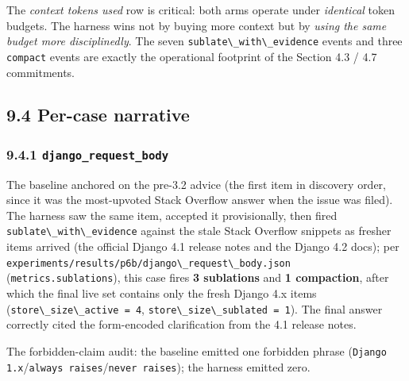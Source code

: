 \begin{table}[!tbp]
\centering
\caption{\textbf{T3 --- P6-B per-case detail.} Sublations fired, compactions, forbidden-claim audit, and final-answer correctness for each of the three Python issues. Source: \texttt{experiments/results/p6b/\_summary.json}.}
\label{tab:t3_p6b}
{\scriptsize\setlength{\tabcolsep}{3pt}%
}
\end{table}

The \emph{context tokens used} row is critical: both arms operate under \emph{identical} token budgets. The harness wins not by buying more context but by \emph{using the same budget more disciplinedly}. The seven \passthrough{\lstinline!sublate\_with\_evidence!} events and three \passthrough{\lstinline!compact!} events are exactly the operational footprint of the Section 4.3 / 4.7 commitments.

\subsection{9.4 Per-case narrative}\label{per-case-narrative}

\subsubsection{\texorpdfstring{9.4.1 \texttt{django\_request\_body}}{9.4.1 django\_request\_body}}\label{django_request_body}

The baseline anchored on the pre-3.2 advice (the first item in discovery order, since it was the most-upvoted Stack Overflow answer when the issue was filed). The harness saw the same item, accepted it provisionally, then fired \passthrough{\lstinline!sublate\_with\_evidence!} against the stale Stack Overflow snippets as fresher items arrived (the official Django 4.1 release notes and the Django 4.2 docs); per \passthrough{\lstinline!experiments/results/p6b/django\_request\_body.json!} (\passthrough{\lstinline!metrics.sublations!}), this case fires \textbf{3 sublations} and \textbf{1 compaction}, after which the final live set contains only the fresh Django 4.x items (\passthrough{\lstinline!store\_size\_active = 4!}, \passthrough{\lstinline!store\_size\_sublated = 1!}). The final answer correctly cited the form-encoded clarification from the 4.1 release notes.

The forbidden-claim audit: the baseline emitted one forbidden phrase (\passthrough{\lstinline!Django 1.x!}/\passthrough{\lstinline!always raises!}/\passthrough{\lstinline!never raises!}); the harness emitted zero.

